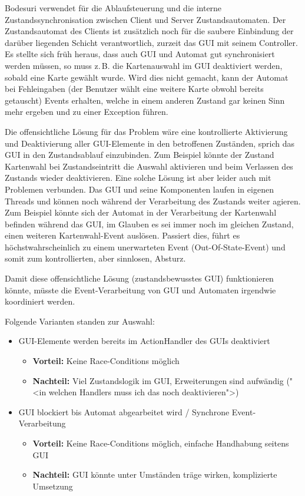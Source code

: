 \documentclass[12pt,halfparskip]{scrartcl}
\begin{document}
Bodesuri verwendet für die Ablaufsteuerung und die interne Zustandssynchronisation zwischen Client und Server Zustandsautomaten. Der Zustandsautomat des Clients ist zusätzlich noch für die saubere Einbindung der darüber liegenden Schicht verantwortlich, zurzeit das GUI mit seinem Controller. Es stellte sich früh heraus, dass auch GUI und Automat gut synchronisiert werden müssen, so muss z.\,B. die Kartenauswahl im GUI deaktiviert werden, sobald eine Karte gewählt wurde. Wird dies nicht gemacht, kann der Automat bei Fehleingaben (der Benutzer wählt eine weitere Karte obwohl bereits getauscht) Events erhalten, welche in einem anderen Zustand gar keinen Sinn mehr ergeben und zu einer Exception führen.

Die offensichtliche Lösung für das Problem wäre eine kontrollierte Aktivierung und Deaktivierung aller GUI-Elemente in den betroffenen Zuständen, sprich das GUI in den Zustandsablauf einzubinden. Zum Beispiel könnte der Zustand Kartenwahl bei Zustandseintritt die Auswahl aktivieren und beim Verlassen des Zustands wieder deaktivieren. Eine solche Lösung ist aber leider auch mit Problemen verbunden. Das GUI und seine Komponenten laufen in eigenen Threads und können noch während der Verarbeitung des Zustands weiter agieren. Zum Beispiel könnte sich der Automat in der Verarbeitung der Kartenwahl befinden während das GUI, im Glauben es sei immer noch im gleichen Zustand, einen weiteren Kartenwahl-Event auslösen. Passiert dies, führt es höchstwahrscheinlich zu einem unerwarteten Event (Out-Of-State-Event) und somit zum kontrollierten, aber sinnlosen, Absturz.

Damit diese offensichtliche Lösung (zustandsbewusstes GUI) funktionieren könnte, müsste die Event-Verarbeitung von GUI und Automaten irgendwie koordiniert werden.

Folgende Varianten standen zur Auswahl:

\begin{itemize}
	\item GUI-Elemente werden bereits im ActionHandler des GUIs deaktiviert
	\begin{itemize}
		\item \textbf{Vorteil:} Keine Race-Conditions möglich
		\item \textbf{Nachteil:} Viel Zustandslogik im GUI, Erweiterungen sind aufwändig ("<in welchen Handlers muss ich das noch deaktivieren">)
	\end{itemize}
	\item GUI blockiert bis Automat abgearbeitet wird / Synchrone Event-Verarbeitung
	\begin{itemize}
		\item \textbf{Vorteil:} Keine Race-Conditions möglich, einfache Handhabung seitens GUI
		\item \textbf{Nachteil:} GUI könnte unter Umständen träge wirken, komplizierte Umsetzung
	\end{itemize}
\end{itemize}
\end{document}
